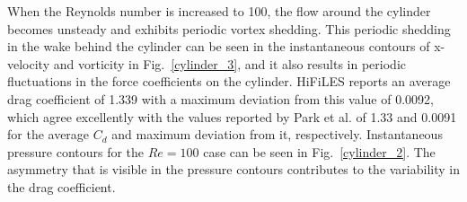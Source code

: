 
When the Reynolds number is increased to 100, the flow around the cylinder becomes unsteady and exhibits periodic vortex shedding. This periodic shedding in the wake behind the cylinder can be seen in the instantaneous contours of x-velocity and vorticity in Fig.~\ref{cylinder_3}, and it also results in periodic fluctuations in the force coefficients on the cylinder. HiFiLES reports an average drag coefficient of 1.339 with a maximum deviation from this value of 0.0092, which agree excellently with the values reported by Park et al. of 1.33 and 0.0091 for the average $C_d$ and maximum deviation from it, respectively.  Instantaneous pressure contours for the $Re = 100$ case can be seen in Fig.~\ref{cylinder_2}. The asymmetry that is visible in the pressure contours contributes to the variability in the drag coefficient.

